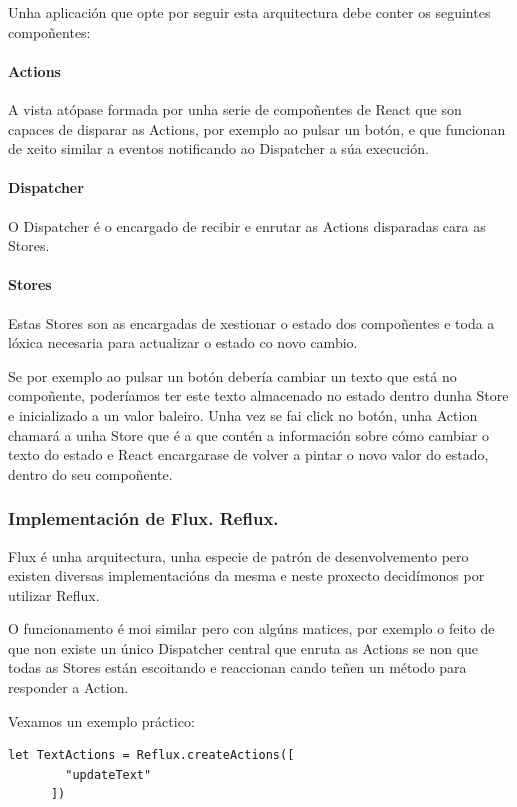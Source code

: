       Unha aplicación que opte por seguir esta arquitectura debe conter os 
seguintes compoñentes:

        \paragraph{Actions}
        A vista atópase formada por unha serie de compoñentes de React que son 
capaces de disparar as Actions, por exemplo ao pulsar un botón, e que funcionan 
de xeito similar a eventos notificando ao Dispatcher a súa execución.
        \paragraph{Dispatcher}
        O Dispatcher é o encargado de recibir e enrutar as Actions disparadas 
cara as Stores.
        \paragraph{Stores}
        Estas Stores son as encargadas de xestionar o estado dos compoñentes e 
toda a lóxica necesaria para actualizar o estado co novo cambio.

        Se por exemplo ao pulsar un botón debería cambiar un texto que está no 
compoñente, poderíamos ter este texto almacenado no estado dentro dunha Store e 
inicializado a un valor baleiro.
        Unha vez se fai click no botón, unha Action chamará a unha Store que é 
a que contén a información sobre cómo cambiar o texto do estado e React 
encargarase de volver a pintar o novo valor do estado, dentro do seu compoñente.

      \subsubsection{Implementación de Flux. Reflux.}
      Flux é unha arquitectura, unha especie de patrón de desenvolvemento pero 
existen diversas implementacións da mesma e neste proxecto decidímonos por 
utilizar Reflux.

      O funcionamento é moi similar pero con algúns matices, por exemplo o 
feito de que non existe un único Dispatcher central que enruta as 
Actions se non que todas as Stores están escoitando e reaccionan cando teñen un 
método para responder a Action.

     Vexamos un exemplo práctico:

     \begin{lstlisting}[frame=single]
      let TextActions = Reflux.createActions([
        "updateText"
      ])
    \end{lstlisting}

